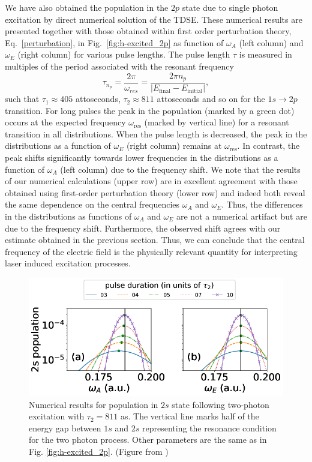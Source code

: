 We have also obtained the population in the $2p$ state due to single photon excitation by direct numerical solution of the TDSE. These numerical results are presented together with those obtained within first order perturbation theory, Eq.~\ref{perturbation}, in Fig.~\ref{fig:h-excited_2p} as function of $\omega_A$ (left column) and $\omega_E$ (right column) for various pulse lengths. The pulse length $\tau$ is measured in multiples of the period associated with the resonant frequency
\begin{equation}
\tau_{n_p} = \frac{2\pi}{\omega_{res}} = \frac{2\pi n_p}{|E_\text{final}-E_\text{initial}|},
\end{equation}
such that $\tau_1\approx 405$ attoseconds, $\tau_2 \approx 811$ attoseconds and so on for the $1s \rightarrow 2p$ transition. For long pulses the peak in the population (marked by a green dot) occurs at the expected frequency $\omega_\text{res}$ (marked by vertical line) for a resonant transition in all distributions. When the pulse length is decreased, the peak in the distributions as a function of $\omega_E$ (right column) remains at $\omega_\text{res}$. In contrast, the peak shifts significantly towards lower frequencies in the distributions as a function of $\omega_A$ (left column) due to the frequency shift. We note that the results of our numerical calculations (upper row) are in excellent agreement with those obtained using first-order perturbation theory (lower row) and indeed both reveal the same dependence on the central frequencies $\omega_A$ and $\omega_E$. Thus, the differences in the distributions as functions of $\omega_A$ and $\omega_E$ are not a numerical artifact but are due to the frequency shift. Furthermore, the observed shift agrees with our estimate obtained in the previous section. Thus, we can conclude that the central frequency of the electric field is the physically relevant quantity for interpreting laser induced excitation processes.


\begin{figure}[!ht]
\centering
       \includegraphics[width=0.8\linewidth]{figs/Frequency_shift/2s_population_comb.png}
\caption{
Numerical results for population in $2s$ state following two-photon excitation with $\tau_2=811$ as. The vertical line marks half of the energy gap between $1s$ and $2s$ representing the resonance condition for the two photon process. Other parameters are the same as in Fig.  \ref{fig:h-excited_2p}. (Figure from \cite{venzke2018_Central})
}
  \label{fig:h-excited_2s}
\end{figure}

